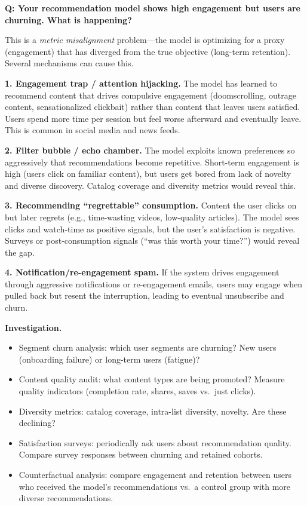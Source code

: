 \begin{interviewq}
\textbf{Q: Your recommendation model shows high engagement but users are churning. What is happening?}

 \quad {} \quad \badgefreq{\freqmed}

\stronganswer

This is a \textit{metric misalignment} problem---the model is optimizing for a proxy (engagement) that has diverged from the true objective (long-term retention). Several mechanisms can cause this.

\textbf{1. Engagement trap / attention hijacking.} The model has learned to recommend content that drives compulsive engagement (doomscrolling, outrage content, sensationalized clickbait) rather than content that leaves users satisfied. Users spend more time per session but feel worse afterward and eventually leave. This is common in social media and news feeds.

\textbf{2. Filter bubble / echo chamber.} The model exploits known preferences so aggressively that recommendations become repetitive. Short-term engagement is high (users click on familiar content), but users get bored from lack of novelty and diverse discovery. Catalog coverage and diversity metrics would reveal this.

\textbf{3. Recommending ``regrettable'' consumption.} Content the user clicks on but later regrets (e.g., time-wasting videos, low-quality articles). The model sees clicks and watch-time as positive signals, but the user's satisfaction is negative. Surveys or post-consumption signals (``was this worth your time?'') would reveal the gap.

\textbf{4. Notification/re-engagement spam.} If the system drives engagement through aggressive notifications or re-engagement emails, users may engage when pulled back but resent the interruption, leading to eventual unsubscribe and churn.

\textbf{Investigation.}
\begin{itemize}
    \item Segment churn analysis: which user segments are churning? New users (onboarding failure) or long-term users (fatigue)?
    \item Content quality audit: what content types are being promoted? Measure quality indicators (completion rate, shares, saves vs.\ just clicks).
    \item Diversity metrics: catalog coverage, intra-list diversity, novelty. Are these declining?
    \item Satisfaction surveys: periodically ask users about recommendation quality. Compare survey responses between churning and retained cohorts.
    \item Counterfactual analysis: compare engagement and retention between users who received the model's recommendations vs.\ a control group with more diverse recommendations.
\end{itemize}


\end{interviewq}
